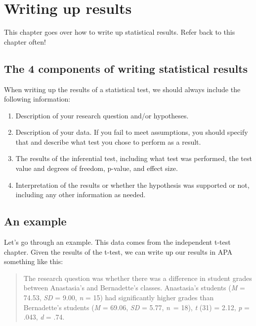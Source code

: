 \documentclass[
]{book}
\begin{document}
\hypertarget{writing-up-results}{%
\chapter{Writing up results}\label{writing-up-results}}

This chapter goes over how to write up statistical results. Refer back to this chapter often!

\hypertarget{the-4-components-of-writing-statistical-results}{%
\section{The 4 components of writing statistical results}\label{the-4-components-of-writing-statistical-results}}

When writing up the results of a statistical test, we should always include the following information:

\begin{enumerate}
\def\labelenumi{\arabic{enumi}.}
\item
  Description of your research question and/or hypotheses.
\item
  Description of your data. If you fail to meet assumptions, you should specify that and describe what test you chose to perform as a result.
\item
  The results of the inferential test, including what test was performed, the test value and degrees of freedom, p-value, and effect size.
\item
  Interpretation of the results or whether the hypothesis was supported or not, including any other information as needed.
\end{enumerate}

\hypertarget{an-example-1}{%
\section{An example}\label{an-example-1}}

Let's go through an example. This data comes from the independent t-test chapter. Given the results of the t-test, we can write up our results in APA something like this:

\begin{quote}
The research question was whether there was a difference in student grades between Anastasia's and Bernadette's classes. Anastasia's students (\emph{M} = 74.53, \emph{SD} = 9.00, \emph{n} = 15) had significantly higher grades than Bernadette's students (\emph{M} = 69.06, \emph{SD} = 5.77, \emph{n}~= 18), \emph{t} (31) = 2.12, \emph{p} = .043, \emph{d} = .74.
\end{quote}
\end{document}
